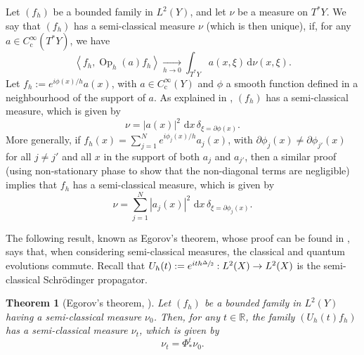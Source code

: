\documentclass[JEP,XML,SOM,Unicode,published]{cedram}
\newcommand{\rc}{\mathrm{c}}
\newcommand{\rd}{\,\mathrm{d}}
\DeclareMathOperator{\Op}{Op}
\theoremstyle{plain}
\newtheorem{theorem}{Theorem}[section]
\theoremstyle{definition}
\newcommand{\R}{\mathbb{R}}
\begin{document}
\begin{appendix}
Let $(f_h)$ be a bounded family in $L^2(Y)$, and let $\nu$ be a measure on $T^*Y$. We say that $(f_h)$ has a semi-classical measure $\nu$ (which is then unique), if, for any $a\in C_\rc^\infty(T^*Y)$, we have\vspace*{-3pt}
\[
\left\langle f_h, \Op_h(a) f_h \right\rangle \xrightarrow[h \to 0]{} \int_{T^*Y} a(x,\xi) \rd \nu(x,\xi).
\]
Let $f_h:= e^{i\phi(x)/h} a(x)$, with $a\in C_\rc^\infty(Y)$ and $\phi$ a smooth function defined in a neighbourhood of the support of $a$. As explained in \cite[\S 5.1, Ex.\,2]{Zworski_2012}, $(f_h)$ has a semi-classical measure, which is given by\vspace*{-3pt}
\begin{equation*}
\nu = |a(x)|^2 \,\rd x\, \delta_{\xi= \partial \phi(x)}.
\end{equation*}
More generally, if $f_h(x) = \sum_{j=1}^N e^{i\phi_j(x)/h} a_{j}(x)$, with $\partial \phi_j(x) \neq \partial \phi_{j'}(x)$ for all $j\neq j'$ and all $x$ in the support of both $a_j$ and $a_{j'}$, then a similar proof (using non-stationary phase to show that the non-diagonal terms are negligible) implies that $f_h$ has a semi-classical measure, which is given by
\begin{equation}\label{eq:semi-classical_measure}
\nu = \sum_{j=1}^N |a_j(x)|^2 \,\rd x\, \delta_{\xi= \partial \phi_j(x)}.
\end{equation}

The following result, known as Egorov's theorem, whose proof can be found in \hbox{\cite[\S 15]{Zworski_2012}}, says that, when considering semi-classical measures, the classical and quantum evolutions commute. Recall that $U_h(t):=e^{ith\sfrac{\Delta}{2}}:L^2(X)\to L^2(X)$ is the semi-classical Schrödinger propagator.

\begin{theorem}[Egorov's theorem, {\cite[Th.\,15.2]{Zworski_2012}}]\label{t:Egorov}
Let $(f_h)$ be a bounded family in $L^2(Y)$ having a semi-classical measure $\nu_0$. Then, for any $t\in \R$, the family $\left(U_h(t) f_h \right)$ has a semi-classical measure $\nu_t$, which is given by\vspace*{-3pt}
\[
\nu_t = \Phi^t_* \nu_0.
\]
\end{theorem}


\end{appendix}
\end{document}
